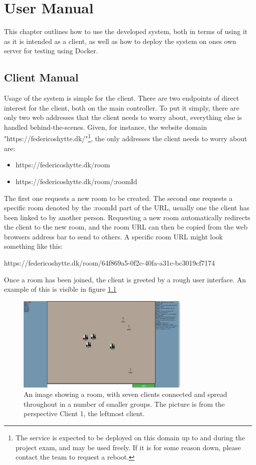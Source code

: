 \chapter{User Manual}

This chapter outlines how to use the developed system, both in terms of using it as it is intended as a client, as well as how to deploy the system on ones own server for testing using Docker.

\section{Client Manual}

Usage of the system is simple for the client. There are two endpoints of direct interest for the client, both on the main controller. To put it simply, there are only two web addresses that the client needs to worry about, everything else is handled behind-the-scenes. Given, for instance, the website domain "https://federicoshytte.dk/"\footnote{The service is expected to be deployed on this domain up to and during the project exam, and may be used freely. If it is for some reason down, please contact the team to request a reboot.}, the only addresses the client needs to worry about are:

\begin{itemize}
    \item https://federicoshytte.dk/room
    \item https://federicoshytte.dk/room/:roomId
\end{itemize}

The first one requests a new room to be created. The second one requests a specific room denoted by the :roomId part of the URL, usually one the client has been linked to by another person. Requesting a new room automatically redirects the client to the new room, and the room URL can then be copied from the web browsers address bar to send to others. A specific room URL might look something like this:

https://federicoshytte.dk/room/64f869a5-0f2c-40fa-a31c-bc3019cf7174

Once a room has been joined, the client is greeted by a rough user interface. An example of this is visible in figure \ref{fig:coffeebreakui}

\begin{figure}[H]
    \centering
    \includegraphics[width=0.75\textwidth]{Pictures/CoffeeBreakUI3.png}
    \caption{An image showing a room, with seven clients connected and spread throughout in a number of smaller groups. The picture is from the perspective Client 1, the leftmost client.}
    \label{fig:coffeebreakui}
\end{figure}

